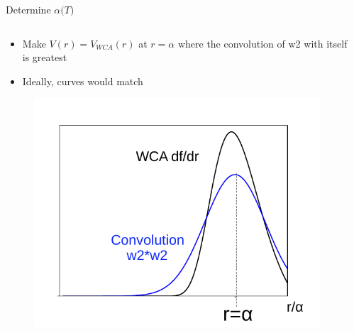 \documentclass{beamer}
\begin{document}
\begin{frame}{Determine $\alpha{(}T)$}
	\begin{columns}[t]
	    \vspace{-01em}
		\begin{block}{}
			\begin{itemize}
			    \item Make $V(r)=V_{WCA}(r)$ at $r=\alpha$ where 
			    the convolution of w2 with itself is greatest
			    \item Ideally, curves would match
			\end{itemize}
				\vspace{-0.5em}
			   \begin{figure}
                   \centering
                   \includegraphics[width=.9\columnwidth]{figs/df_dr_with_xi_fromB2_pic.pdf}
                \end{figure}
		\end{block}	  
		\column{.55\textwidth}
        \vspace{-0.5em}
        \begin{block}{}
        \begin{itemize}

\end{itemize}
\end{block}
\end{columns}
\end{frame}
\end{document}
